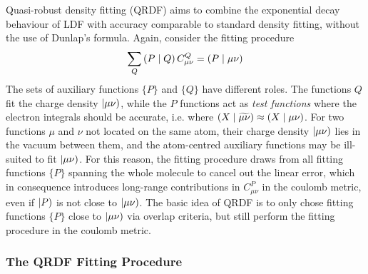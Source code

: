 Quasi-robust density fitting (QRDF) aims to combine the exponential decay behaviour of LDF with accuracy comparable to standard density fitting, without the use of Dunlap's formula. Again, consider the fitting procedure 
\begin{equation}
\sum_Q \left( P \mid Q \right) C^Q_{\mu\nu} = \left( P \mid \mu\nu \right)
\end{equation}
\noindent The sets of auxiliary functions $\{P\}$ and $\{Q\}$ have different roles. The functions $Q$ fit the charge density $\left\lvert \mu\nu \right)$, while the $P$ functions act as \emph{test functions} where the electron integrals should be accurate, i.e. where $\left( X \mid \widetilde{\mu\nu} \right) \approx \left( X \mid \mu\nu \right)$. For two functions $\mu$ and $\nu$ not located on the same atom, their charge density $\left\lvert \mu\nu \right)$ lies in the vacuum between them, and the atom-centred auxiliary functions may be ill-suited to fit $\left\lvert \mu\nu \right)$. For this reason, the fitting procedure draws from all fitting functions $\{P\}$ spanning the whole molecule to cancel out the linear error, which in consequence introduces long-range contributions in $C_{\mu\nu}^P$ in the coulomb metric, even if $\left\lvert P \right)$ is not close to $\left\lvert \mu\nu \right)$. 
The basic idea of QRDF is to only chose fitting functions $\{P\}$ close to $\left\lvert \mu\nu \right)$ via overlap criteria, but still perform the fitting procedure in the coulomb metric.

\subsubsection{The QRDF Fitting Procedure}

